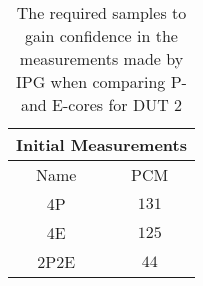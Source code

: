 \begin{table}[H]
    \centering
    \begin{tabular}{|| c | c ||}
    \hline
    \multicolumn{2}{||c||}{Initial Measurements} \\ [0.5ex] \hline\hline
    Name & PCM \\\hline
    4P & $131$ \\
    4E & $125$ \\
    2P2E& $44$ \\\hline
    \end{tabular}
    \caption{The required samples to gain confidence in the measurements made by IPG when comparing P- and E-cores for DUT 2}
    \label{tab:initial-measurements-bonus}
\end{table}